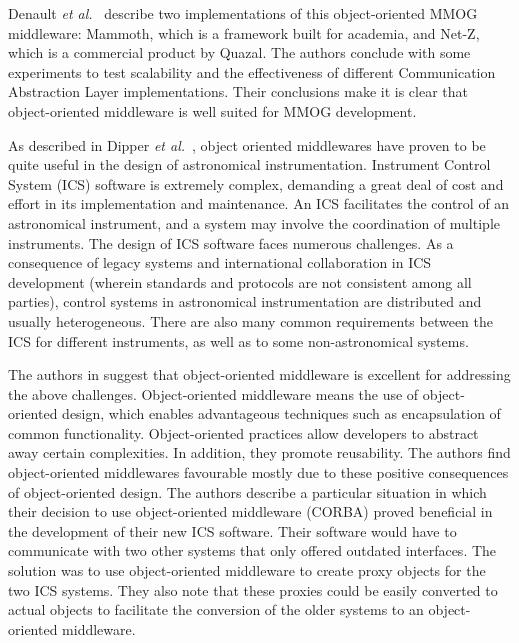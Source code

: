 \documentclass{acm_proc_article-sp}
\def\etal{{\it et al.\/}}
\begin{document}
Denault \etal\ \cite{Denault:2008p8364} describe two implementations of this object-oriented MMOG middleware: Mammoth, which is a framework built for academia, and Net-Z, which is a commercial product by Quazal.  The authors conclude with some experiments to test scalability and the effectiveness of different Communication Abstraction Layer implementations. Their conclusions make it is clear that object-oriented middleware is well suited for MMOG development.




As described in Dipper \etal\ \cite{Dipper:2004p8366}, object oriented middlewares have proven to be quite useful in the design of astronomical instrumentation.  Instrument Control System (ICS) software is extremely complex, demanding a great deal of cost and effort  in its implementation and maintenance.  An ICS facilitates the control of an astronomical instrument, and a system may involve the coordination of multiple instruments.  The design of ICS software faces numerous challenges.  As a consequence of legacy systems and international collaboration in ICS development (wherein standards and protocols are not consistent among all parties), control systems in astronomical instrumentation are distributed and usually heterogeneous.  There are also many common requirements between the ICS for different instruments, as well as to some non-astronomical systems.

The authors in \cite{Dipper:2004p8366} suggest that object-oriented middleware is excellent for addressing the above challenges.  Object-oriented middleware means the use of object-oriented design, which enables advantageous techniques such as encapsulation of common functionality.  Object-oriented practices allow developers to abstract away certain complexities.  In addition, they promote reusability.  The authors find object-oriented middlewares favourable mostly due to these positive consequences of object-oriented design.    The authors describe a particular situation in which their decision to use object-oriented middleware (CORBA) proved beneficial in the development of their new ICS software.  Their software would have to communicate with two other systems that only offered outdated interfaces.  The solution was to use object-oriented middleware to create proxy objects for the two ICS systems.  They also note that these proxies could be easily converted to actual objects to facilitate the conversion of the older systems to an object-oriented middleware.
\end{document}
